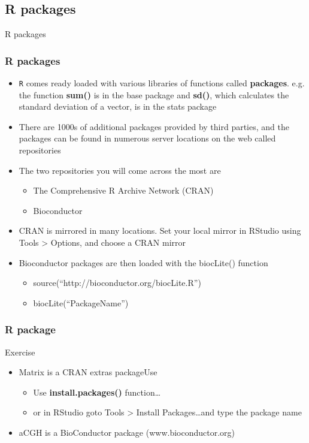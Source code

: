\documentclass{beamer}
\begin{document}
\subsection{R packages}
\begin{frame}
	\centering \Huge R packages
\end{frame}

\begin{frame}[fragile]
	\frametitle{R packages}
	\begin{itemize}
	\small
\item \texttt{R} comes ready loaded with various libraries of functions called \textbf{packages}. e.g. the function \textbf{sum()} is in the base package and \textbf{sd()}, which calculates the standard deviation of a vector, is in the stats package
	\pause
		\item There are 1000s of additional packages provided by third parties, and the packages can be found in numerous server locations on the web called repositories
	\pause
		\item The two repositories you will come across the most are
			\begin{itemize}
				\item The Comprehensive R Archive Network (CRAN)
				\item Bioconductor
			\end{itemize}
	\pause
		\item CRAN is mirrored in many locations. Set your local mirror in RStudio using Tools > Options, and choose a CRAN mirror
	\pause
		\item Bioconductor packages are then loaded with the biocLite() function
			\begin{itemize}
				\item source(``http://bioconductor.org/biocLite.R'')
				\item biocLite(``PackageName'')
			\end{itemize}
	\end{itemize}
\end{frame}

 
\begin{frame}[fragile]
	\frametitle{R package}
	\centering \Huge Exercise
	\begin{itemize}
	\small
		\item Matrix is a CRAN extras packageUse
			\begin{itemize}
				\item Use \textbf{install.packages()} function\ldots
				\item or in RStudio goto Tools > Install Packages\ldots and type the package name
			\end{itemize}
		\item aCGH is a BioConductor package (www.bioconductor.org)
	\end{itemize}
\end{frame}
\end{document}
